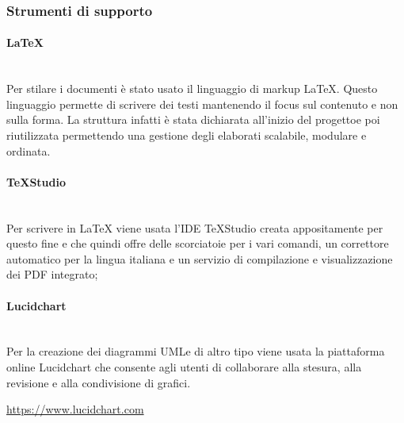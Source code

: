            \subsubsection{Strumenti di supporto}
                \paragraph{\LaTeX}\mbox{}\\ [1mm]
                    Per stilare i documenti è stato usato il linguaggio di markup \LaTeX \xspace. Questo linguaggio permette di scrivere dei testi mantenendo il focus
                    sul contenuto e non sulla forma. La struttura infatti è stata dichiarata all'inizio del progetto\glosp e poi riutilizzata permettendo una gestione degli elaborati scalabile, modulare e ordinata.
                \paragraph{TeXStudio}\mbox{}\\ [1mm]
                    Per scrivere in \LaTeX \xspace viene usata l'IDE TeXStudio creata appositamente per questo fine e che quindi offre delle scorciatoie
                    per i vari comandi, un correttore automatico per la lingua italiana e un servizio di compilazione e visualizzazione dei PDF integrato;
                \paragraph{Lucidchart}\mbox{}\\ [1mm]
                    Per la creazione dei diagrammi UML\glosp e di altro tipo viene usata la piattaforma online Lucidchart che consente agli utenti di collaborare alla stesura, alla revisione e alla condivisione di grafici. \newline \newline
                    \centerline{\url{https://www.lucidchart.com}}